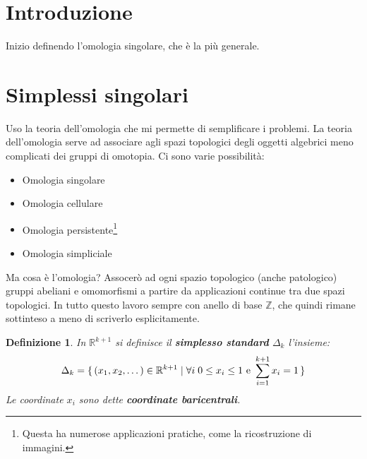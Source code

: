 \documentclass[10pt, twoside=false, x11names]{scrbook}
\newtheorem{definition}[theorem]{Definizione}
\newcommand{\Z}{\mathbb{Z}}
\newcommand{\RN}[1][]{\mathbb{R}^#1}
\begin{document}
\section{Introduzione}

Inizio definendo l'omologia singolare, che è la più generale.

\section{Simplessi singolari}

Uso la teoria dell'omologia che mi permette di semplificare i problemi. La teoria
dell'omologia serve ad associare agli spazi topologici degli oggetti algebrici
meno complicati dei gruppi di omotopia.
Ci sono varie possibilità:
\begin{itemize}
  \item Omologia singolare
  \item Omologia cellulare
  \item Omologia persistente\footnote{Questa ha numerose applicazioni pratiche, come la ricostruzione di immagini.}
  \item Omologia simpliciale
\end{itemize}
Ma cosa è l'omologia? Assocerò ad ogni spazio topologico (anche patologico) gruppi abeliani e omomorfismi a partire
da applicazioni continue tra due spazi topologici. In tutto questo lavoro sempre con anello di base $ \Z $, che
quindi rimane sottinteso a meno di scriverlo esplicitamente.

\begin{definition}
  In $ \RN{k+1} $ si definisce il \textbf{simplesso standard} $ \Delta_k $ l'insieme:
  \[
    \Delta_k = \set{(x_1,x_2,\dots) \in \RN{k+1} | \forall i \; 0 \leq x_i \leq 1 \text{ e } \sum_{i=1}^{k+1}x_i = 1}
  \]
  Le coordinate $ x_i $ sono dette \textbf{coordinate baricentrali}.
\end{definition}
\end{document}
